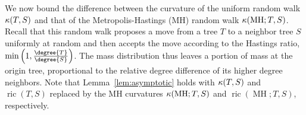 \documentclass[11pt,onecolumn,conference]{IEEEtran}
\newcommand{\MH}{\operatorname{MH}}
\newcommand{\cuttable}[2][]{%
    \ifthenelse{\equal{#1}{}}%
		{}%
		{#1}%
}
\newcommand{\curvature}[2][]{%
    \ifthenelse{\equal{#1}{}}%
		{\kappa(#2)}%
		{\kappa_{#1}(#2)}%
}
\newcommand{\ric}[1]{
	\operatorname{ric}(#1)%
}
\begin{document}
\cuttable{
\begin{proof}
	We first prove the lower bound in the uniform case, that is $\curvature{T,S} \le \ric{T,S}$.
	Let $W_1(T,S)$ be the mass transport cost in the uniform case, and $W_1'(T,S)$ be the same for the lazy uniform case with parameter $p$.
	Recall that $\curvature{T,S} = \curvature[1]{T,S} = 1 - \frac{W_1(T,S)}{\dspr{T,S}}$, and $\curvature[p]{T,S} / p = \left. \left(1 - \frac{W_1'(T,S)}{\dspr{T,S}}\right) \right/ p$.
	Observe that $$W_1'(T,S) \le pW_1(T,S) + (1-p) \, \dspr{T,S},$$ by the simple mass transport program obtained by treating the mass at $T$ and $S$ as separate from that of the neighbors.
	Then:
	\begin{align*}
		\curvature[p]{T,S} /p &= \left. \left(1 - \frac{W_1'(T,S)}{\dspr{T,S}}\right) \right/ p \\
		&\ge \left. \left(1 - \frac{pW_1(T,S) + (1-p)\dspr{T,S}}{\dspr{T,S}}\right) \right/ p \\
		&= \frac{1}{p} - \frac{W_1(T,S)}{\dspr{T,S}} - \frac{1-p}{p} \\
		&= 1 - \frac{W_1(T,S)}{\dspr{T,S}} \\
		&= \curvature{T,S}.
	\end{align*}

	For the upper bound, we observe that $$W_1'(T,S) \ge p W_1(T,S) + (1-p) \, \dspr{T,S} - \frac{2}{\max(\degree{T}, \degree{S})},$$ as at most $1 / \max(\degree{T},\degree{S})$ of the mass can remain at each of $T$ and $S$, paired with the lazy remainder.
	The upper bound then follows analogously to the lower bound.
	Moreover, no mass can remain at $T$ or $S$ when $\dspr{T,S} > 1$, in which case the curvatures are equal.
\end{proof}
}

We now bound the difference between the curvature of the uniform random walk $\curvature{T,S}$ and that of the Metropolis-Hastings (MH) random walk $\curvature{\MH; T,S}$.
Recall that this random walk proposes a move from a tree $T$ to a neighbor tree $S$ uniformly at random and then accepts the move according to the Hastings ratio, \cuttable{which in this case is }$\min\left(1, \frac{\degree{T}}{\degree{S}}\right)$.
The mass distribution \cuttable{for the MH random walk }thus leaves a portion of mass at the origin tree, proportional to the relative degree difference of its higher degree neighbors.
Note that \cuttable{the same statement and proof of }Lemma~\ref{lem:asymptotic} holds with $\curvature{T,S}$ and $\ric{T,S}$ replaced by the MH curvatures $\curvature{\MH; T,S}$ and $\ric{\MH; T,S}$, respectively.
\end{document}
